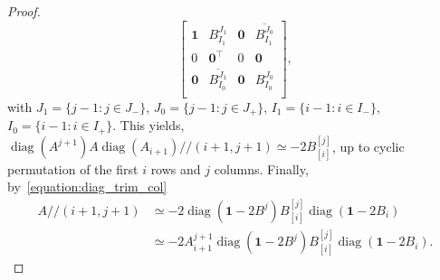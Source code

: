 \documentclass[10pt,a4paper]{amsart}
\DeclareMathOperator{\diag}{diag}
\newcommand{\trim}{/\!\!/}
\begin{document}
\begin{proof}
$$\begin{bmatrix}
\mathbf{1} & B_{I_1}^{J_1} &\mathbf{0}& \overline{B_{I_1}^{J_0}} \\
0 & \mathbf{0}^\top & 0 &\mathbf{0}\\
\mathbf{0} & \overline{B_{I_0}^{J_1}} &\mathbf{0}& B_{I_0}^{J_0} \\
\end{bmatrix},$$
with $J_1 = \{j-1\colon j\in J_-\}$, $J_0 = \{j-1\colon j\in J_+\}$, $I_1 = \{i-1\colon i\in I_-\}$, $I_0 = \{i-1\colon i\in I_+\}$.
This yields, $\diag(A^{j+1})A\diag(A_{i+1})\trim(i+1,j+1) \simeq -2 B_{[i]}^{[j]}$, up to cyclic permutation of the first $i$ rows and $j$ columns.
Finally, by~\eqref{equation:diag_trim_col}
\begin{align*}
A\trim(i+1,j+1) &\simeq -2 \diag(\mathbf{1} -2 B^j) B_{[i]}^{[j]}\diag(\mathbf{1}-2 B_i)\\
& \simeq -2 A_{i+1}^{j+1} \diag(\mathbf{1} -2 B^j) B_{[i]}^{[j]}\diag(\mathbf{1}-2 B_i).
\end{align*}


\end{proof}
\end{document}

